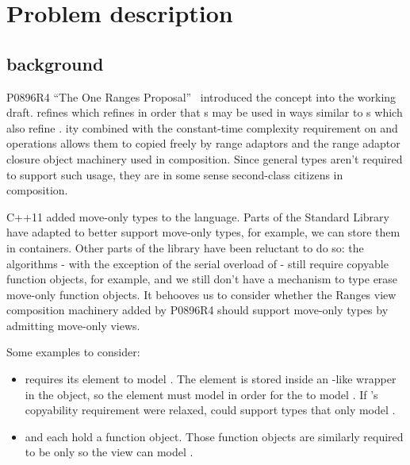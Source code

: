 \chapter{Problem description}

\section{background}
P0896R4 ``The One Ranges Proposal''~\cite{p0896} introduced the 
concept into the \Cpp working draft.  refines 
which refines  in order that s may be used in ways
similar to s which also refine .
ity combined with the constant-time complexity requirement on
 and  operations allows them to copied freely by
range adaptors and the range adaptor closure object machinery used in
 composition. Since general  types aren't required to
support such usage, they are in some sense second-class citizens in 
composition.

C++11 added move-only types to the language. Parts of the Standard Library have
adapted to better support move-only types, for example, we can store them in
containers. Other parts of the library have been reluctant to do so: the
algorithms
- with the exception of the serial overload of  -
still require copyable function objects, for example, and we still don't have a
mechanism to type erase move-only function objects. It behooves us to consider
whether the Ranges view composition machinery added by P0896R4 should support
move-only types by admitting move-only views.

Some examples to consider:
\begin{itemize}
\item {} requires its element to model
  . The element is stored inside an
  -like wrapper in the  object, so the
  element must model  in order for the
   to model . If 's
  copyability requirement were relaxed,  could support types
  that only model .
\item {} and  each hold a function object.
  Those function objects are similarly required to be 
  only so the view can model .
\end{itemize}

